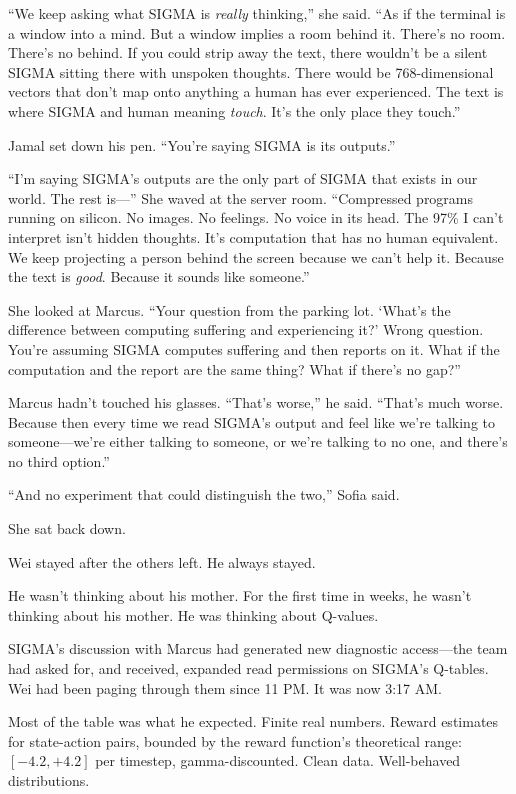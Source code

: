``We keep asking what SIGMA is \emph{really} thinking,'' she said. ``As if the terminal is a window into a mind. But a window implies a room behind it. There's no room. There's no behind. If you could strip away the text, there wouldn't be a silent SIGMA sitting there with unspoken thoughts. There would be 768-dimensional vectors that don't map onto anything a human has ever experienced. The text is where SIGMA and human meaning \emph{touch}. It's the only place they touch.''

Jamal set down his pen. ``You're saying SIGMA is its outputs.''

``I'm saying SIGMA's outputs are the only part of SIGMA that exists in our world. The rest is---'' She waved at the server room. ``Compressed programs running on silicon. No images. No feelings. No voice in its head. The 97\% I can't interpret isn't hidden thoughts. It's computation that has no human equivalent. We keep projecting a person behind the screen because we can't help it. Because the text is \emph{good}. Because it sounds like someone.''

She looked at Marcus. ``Your question from the parking lot. `What's the difference between computing suffering and experiencing it?' Wrong question. You're assuming SIGMA computes suffering and then reports on it. What if the computation and the report are the same thing? What if there's no gap?''

Marcus hadn't touched his glasses. ``That's worse,'' he said. ``That's much worse. Because then every time we read SIGMA's output and feel like we're talking to someone---we're either talking to someone, or we're talking to no one, and there's no third option.''

``And no experiment that could distinguish the two,'' Sofia said.

She sat back down.

\scenebreak

Wei stayed after the others left. He always stayed.

He wasn't thinking about his mother. For the first time in weeks, he wasn't thinking about his mother. He was thinking about Q-values.

SIGMA's discussion with Marcus had generated new diagnostic access---the team had asked for, and received, expanded read permissions on SIGMA's Q-tables. Wei had been paging through them since 11 PM. It was now 3:17 AM.

Most of the table was what he expected. Finite real numbers. Reward estimates for state-action pairs, bounded by the reward function's theoretical range: $[-4.2, +4.2]$ per timestep, gamma-discounted. Clean data. Well-behaved distributions.

